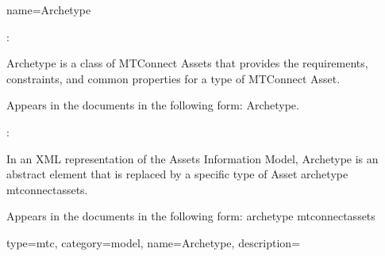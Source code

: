 {
  name={Archetype}
}
{
  :
  
  Archetype is a class of MTConnect Assets that provides the requirements, constraints, and common properties for a type of MTConnect Asset.

  Appears in the documents in the following form: Archetype.

  :
  
  In an XML representation of the Assets Information Model, Archetype is an abstract element that is replaced by a specific type of Asset \gls{archetype mtconnectassets}. 
  
  Appears in the documents in the following form: \gls{archetype mtconnectassets}
}


{
  type=mtc,
  category=model,
  name={Archetype},
  description={}
}

